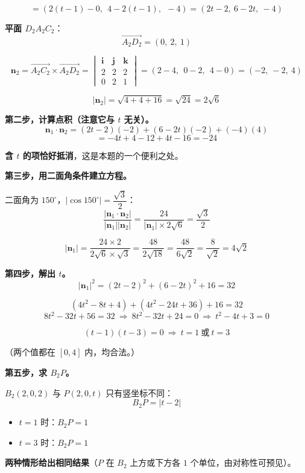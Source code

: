 \[=\left(2(t-1)-0,\ \ 4-2(t-1),\ \ -4\right)=\left(2t-2,\ 6-2t,\ -4\right)\]

\textbf{平面 $D_2A_2C_2$}：
\[\overrightarrow{A_2D_2}=(0,\ 2,\ 1)\]

\[\boldsymbol n_2=\overrightarrow{A_2C_2}\times\overrightarrow{A_2D_2}=\begin{vmatrix}\boldsymbol i&\boldsymbol j&\boldsymbol k\\ 2&2&2\\ 0&2&1\end{vmatrix}=(2-4,\ \ 0-2,\ \ 4-0)=(-2,\ -2,\ 4)\]

\[\left|\boldsymbol n_2\right|=\sqrt{4+4+16}=\sqrt{24}=2\sqrt6\]

\textbf{第二步，计算点积（注意它与 $t$ 无关）。}
\[\boldsymbol n_1\cdot\boldsymbol n_2=(2t-2)(-2)+(6-2t)(-2)+(-4)(4)\]
\[=-4t+4-12+4t-16=-24\]

\textbf{含 $t$ 的项恰好抵消}，这是本题的一个便利之处。

\textbf{第三步，用二面角条件建立方程。}

二面角为 $150^\circ$，$\left|\cos150^\circ\right|=\dfrac{\sqrt3}2$：
\[\frac{\left|\boldsymbol n_1\cdot\boldsymbol n_2\right|}{\left|\boldsymbol n_1\right|\left|\boldsymbol n_2\right|}=\frac{24}{\left|\boldsymbol n_1\right|\times2\sqrt6}=\frac{\sqrt3}2\]

\[\left|\boldsymbol n_1\right|=\frac{24\times2}{2\sqrt6\times\sqrt3}=\frac{48}{2\sqrt{18}}=\frac{48}{6\sqrt2}=\frac{8}{\sqrt2}=4\sqrt2\]

\textbf{第四步，解出 $t$。}
\[\left|\boldsymbol n_1\right|^{2}=(2t-2)^{2}+(6-2t)^{2}+16=32\]

\[\left(4t^{2}-8t+4\right)+\left(4t^{2}-24t+36\right)+16=32\]
\[8t^{2}-32t+56=32\ \Longrightarrow\ 8t^{2}-32t+24=0\ \Longrightarrow\ t^{2}-4t+3=0\]

\[(t-1)(t-3)=0\ \Longrightarrow\ t=1\ \text{或}\ t=3\]

（两个值都在 $[0,4]$ 内，均合法。）

\textbf{第五步，求 $B_2P$。}

$B_2(2,0,2)$ 与 $P(2,0,t)$ 只有竖坐标不同：
\[B_2P=|t-2|\]

\begin{itemize}
\item $t=1$ 时：$B_2P=1$
\item $t=3$ 时：$B_2P=1$
\end{itemize}

\textbf{两种情形给出相同结果}（$P$ 在 $B_2$ 上方或下方各 $1$ 个单位，由对称性可预见）。

